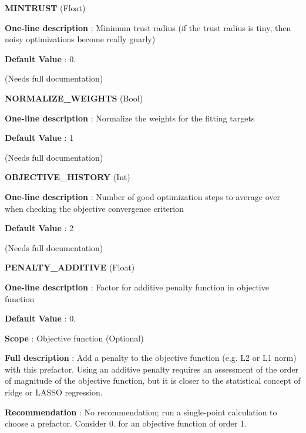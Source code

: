 \begin{DoxyItemize}
\item {\bfseries  \-M\-I\-N\-T\-R\-U\-S\-T } (\-Float) \par
{\bfseries  \-One-\/line description }\-: \-Minimum trust radius (if the trust radius is tiny, then noisy optimizations become really gnarly) \par
{\bfseries  \-Default \-Value }\-: 0. \par
(\-Needs full documentation)\end{DoxyItemize}
\begin{DoxyItemize}
\item {\bfseries  \-N\-O\-R\-M\-A\-L\-I\-Z\-E\-\_\-\-W\-E\-I\-G\-H\-T\-S } (\-Bool) \par
{\bfseries  \-One-\/line description }\-: \-Normalize the weights for the fitting targets \par
{\bfseries  \-Default \-Value }\-: 1 \par
(\-Needs full documentation)\end{DoxyItemize}
\begin{DoxyItemize}
\item {\bfseries  \-O\-B\-J\-E\-C\-T\-I\-V\-E\-\_\-\-H\-I\-S\-T\-O\-R\-Y } (\-Int) \par
{\bfseries  \-One-\/line description }\-: \-Number of good optimization steps to average over when checking the objective convergence criterion \par
{\bfseries  \-Default \-Value }\-: 2 \par
(\-Needs full documentation)\end{DoxyItemize}
\begin{DoxyItemize}
\item {\bfseries  \-P\-E\-N\-A\-L\-T\-Y\-\_\-\-A\-D\-D\-I\-T\-I\-V\-E } (\-Float) \par
{\bfseries  \-One-\/line description }\-: \-Factor for additive penalty function in objective function \par
{\bfseries  \-Default \-Value }\-: 0. \par
{\bfseries  \-Scope }\-: \-Objective function (\-Optional) \par
{\bfseries  \-Full description }\-: \-Add a penalty to the objective function (e.\-g. \-L2 or \-L1 norm) with this prefactor. \-Using an additive penalty requires an assessment of the order of magnitude of the objective function, but it is closer to the statistical concept of ridge or \-L\-A\-S\-S\-O regression. \par
{\bfseries  \-Recommendation }\-: \-No recommendation; run a single-\/point calculation to choose a prefactor. \-Consider 0. for an objective function of order 1.\end{DoxyItemize}

